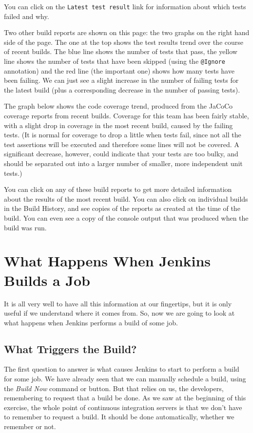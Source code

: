 \documentclass[
]{book}
\begin{document}
You can click on the \texttt{Latest\ test\ result} link for information about which tests failed and why.

Two other build reports are shown on this page: the two graphs on the right hand side of the page. The one at the top shows the test results trend over the course of recent builds. The blue line shows the number of tests that pass, the yellow line shows the number of tests that have been skipped (using the \texttt{@Ignore} annotation) and the red line (the important one) shows how many tests have been failing. We can just see a slight increase in the number of failing tests for the latest build (plus a corresponding decrease in the number of passing tests).

The graph below shows the code coverage trend, produced from the JaCoCo coverage reports from recent builds. Coverage for this team has been fairly stable, with a slight drop in coverage in the most recent build, caused by the failing tests. (It is normal for coverage to drop a little when tests fail, since not all the test assertions will be executed and therefore some lines will not be covered. A significant decrease, however, could indicate that your tests are too bulky, and should be separated out into a larger number of smaller, more independent unit tests.)

You can click on any of these build reports to get more detailed information about the results of the most recent build. You can also click on individual builds in the Build History, and see copies of the reports as created at the time of the build. You can even see a copy of the console output that was produced when the build was run.

\hypertarget{happens}{%
\section{What Happens When Jenkins Builds a Job}\label{happens}}

It is all very well to have all this information at our fingertips, but it is only useful if we understand where it comes from. So, now we are going to look at what happens when Jenkins performs a build of some job.

\hypertarget{triggers}{%
\subsection{What Triggers the Build?}\label{triggers}}

The first question to answer is what causes Jenkins to start to perform a build for some job. We have already seen that we can manually schedule a build, using the \emph{Build Now} command or button. But that relies on us, the developers, remembering to request that a build be done. As we saw at the beginning of this exercise, the whole point of continuous integration servers is that we don't have to remember to request a build. It should be done automatically, whether we remember or not.
\end{document}
